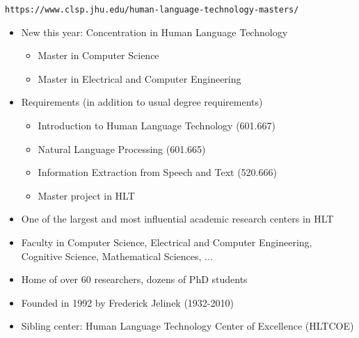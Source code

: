 \documentclass[landscape]{jhuslides3C}
\begin{document}
\vfill
\begin{center}
\tt https://www.clsp.jhu.edu/human-language-technology-masters/
\end{center}
\begin{itemize}
\item New this year: Concentration in Human Language Technology
\begin{itemize}
\item Master in Computer Science
\item Master in Electrical and Computer Engineering
\end{itemize}
\item Requirements (in addition to usual degree requirements)
\begin{itemize}
\item Introduction to Human Language Technology (601.667)
\item Natural Language Processing (601.665)
\item Information Extraction from Speech and Text (520.666)
\item Master project in HLT
\end{itemize}
\end{itemize}
\vfill


\vfill
\begin{itemize}
\item One of the largest and most influential academic research centers in HLT
\item Faculty in Computer Science, Electrical and Computer Engineering, Cognitive Science, Mathematical Sciences, ...
\item Home of over 60 researchers, dozens of PhD students
\item Founded in 1992 by Frederick Jelinek (1932-2010)
\item Sibling center: Human Language Technology Center of Excellence (HLTCOE)
\end{itemize}
\vfill

\end{document}
